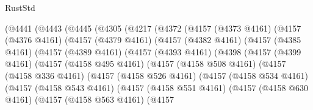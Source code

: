 \begin{lexlean}{RustStd}
\begin{coremodule}
                          (@4441
                            (@4443
                              (@4445
                                (@4305
                                  (@4217
                                    (@4372
                                      (@4157
                                        (@4373 @4161)
                                        (@4157
                                          (@4376 @4161)
                                          (@4157
                                            (@4379 @4161)
                                            (@4157
                                              (@4382 @4161)
                                              (@4157
                                                (@4385 @4161)
                                                (@4157
                                                  (@4389 @4161)
                                                  (@4157
                                                    (@4393 @4161)
                                                    (@4398
                                                      (@4157
                                                        (@4399 @4161)
                                                        (@4157
                                                          (@4158 @495 @4161)
                                                          (@4157
                                                            (@4158 @508 @4161)
                                                            (@4157
                                                              (@4158 @336 @4161)
                                                              (@4157
                                                                (@4158 @526 @4161)
                                                                (@4157
                                                                  (@4158 @534 @4161)
                                                                  (@4157
                                                                    (@4158 @543 @4161)
                                                                    (@4157
                                                                      (@4158 @551 @4161)
                                                                      (@4157
                                                                        (@4158 @630 @4161)
                                                                        (@4157
                                                                          (@4158 @563 @4161)
                                                                          (@4157

\end{coremodule}
\end{lexlean}

